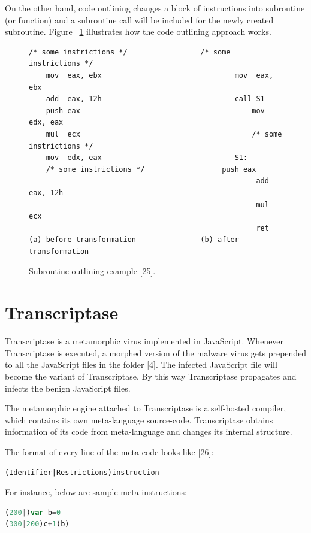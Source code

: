 On the other hand, code outlining changes a block of instructions into subroutine (or function) and a subroutine call will be included for the newly created subroutine. Figure ~\ref{fig:subroutineoutline} illustrates how the code outlining approach works.
\begin{figure}
  \centering
  \begin{lstlisting}[language=myasm]
	/* some instrictions */					/* some instrictions */
	mov  eax, ebx								mov  eax, ebx
	add  eax, 12h								call S1
	push eax										mov  edx, eax
	mul  ecx										/* some instrictions */
	mov  edx, eax								S1: 
	/* some instrictions */ 				 push eax
										 	 	 	 add  eax, 12h
										 	 	 	 mul  ecx
										 	 	 	 ret
(a) before transformation				(b) after transformation
\end{lstlisting}


    \caption[Subroutine outlining example]{Subroutine outlining example [25].}
    \label{fig:subroutineoutline}
\end{figure}

\section{Transcriptase} \label{transcriptasesection}

Transcriptase is a metamorphic virus implemented in JavaScript. Whenever Transcriptase is executed, a morphed version of the malware virus gets prepended to all the JavaScript files in the folder [4]. The infected JavaScript file will become the variant of Transcriptase. By this way Transcriptase propagates and infects the benign JavaScript files.
  
The metamorphic engine attached to Transcriptase is a self-hosted compiler, which contains its own meta-language source-code. Transcriptase obtains information of its code from meta-language and changes its internal structure. 

The format of every line of the meta-code looks like [26]:

\begin{lstlisting}[frame=none,numbers=none]
(Identifier|Restrictions)instruction
\end{lstlisting}
For instance, below are sample meta-instructions:

\begin{lstlisting}[frame=none,numbers=none,language=JavaScript]
(200|)var b=0
(300|200)c+1(b)
\end{lstlisting}

